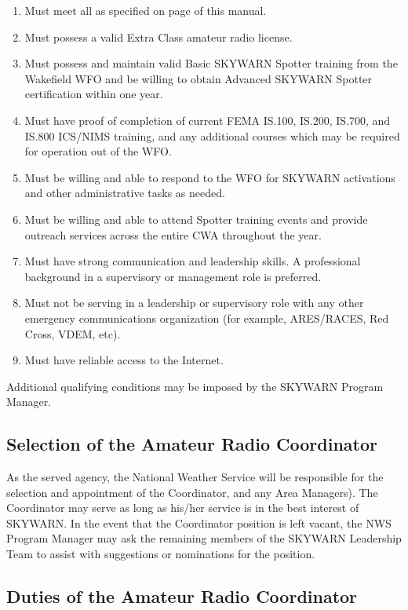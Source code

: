 \documentclass[pdflatex,letterpaper,twoside,12pt]{book}
\begin{document}
\begin{enumerate}
\item Must meet all  as specified on page \pageref{nco-criteria} of this manual.
\item Must possess a valid Extra Class amateur radio license.
\item Must possess and maintain valid Basic SKYWARN Spotter training from the Wakefield WFO and be willing to obtain Advanced SKYWARN Spotter certification within one year.
\item Must have proof of completion of current FEMA IS.100, IS.200, IS.700, and IS.800 ICS/NIMS training, and any additional courses which may be required for operation out of the WFO.
\item Must be willing and able to respond to the WFO for SKYWARN activations and other administrative tasks as needed.
\item Must be willing and able to attend Spotter training events and provide outreach services across the entire CWA throughout the year.
\item Must have strong communication and leadership skills.  A professional background in a supervisory or management role is preferred.
\item Must not be serving in a leadership or supervisory role with any other emergency communications organization (for example, ARES/RACES, Red Cross, VDEM, etc).
\item Must have reliable access to the Internet.
\end{enumerate}

Additional qualifying conditions may be imposed by the SKYWARN Program Manager.

\subsection{Selection of the Amateur Radio Coordinator}

As the served agency, the National Weather Service will be responsible for the selection and appointment of the Coordinator, and any Area Managers).  The Coordinator may serve as long as his/her service is in the best interest of SKYWARN.  In the event that the Coordinator position is left vacant, the NWS Program Manager may ask the remaining members of the SKYWARN Leadership Team to assist with suggestions or nominations for the position.

\subsection{Duties of the Amateur Radio Coordinator}
\end{document}
